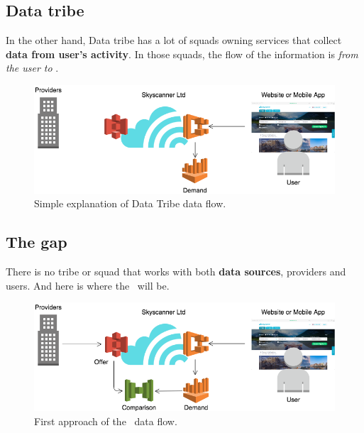\subsection{Data tribe} \label{data_tribe}

In the other hand, Data tribe has a lot of squads owning services that collect \textbf{data from user's activity}. In those squads, the flow of the information is \textit{from the user to \company}.

\begin{figure}[H]
\centering
\includegraphics[scale=0.45]{diagrams/state-of-the-art-tribes-data-tribe.png}
\caption{Simple explanation of Data Tribe data flow.}
\end{figure}

\subsection{The gap}

There is no tribe or squad that works with both \textbf{data sources}, providers and users. And here is where the \thesis\ will be.

\begin{figure}[H]
\centering
\includegraphics[scale=0.45]{diagrams/state-of-the-art-tribes-comparison.png}
\caption{First approach of the \thesis\ data flow.}
\end{figure}



